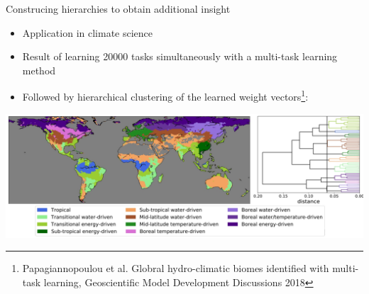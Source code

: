 \documentclass[]{beamer}
\begin{document}
\begin{frame}{Construcing hierarchies to obtain additional insight}

\begin{itemize}
\item Application in climate science
\item Result of learning 20000 tasks simultaneously with a multi-task learning method
\item Followed by hierarchical clustering of the learned weight vectors\footnote{Papagiannopoulou et al. Globral hydro-climatic biomes identified with multi-task learning, Geoscientific Model Development Discussions 2018}:
\end{itemize}
\begin{center}
\includegraphics[scale=0.2]{Figures/biomes} 
\end{center}

\end{frame}
\end{document}
